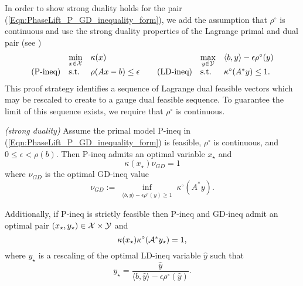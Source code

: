 In order to show strong duality holds for the pair (\ref{Eqn:PhaseLift_P_GD_inequality_form}), we add the assumption that $\rho^\circ$ is continuous and use the strong duality properties of the Lagrange primal and dual pair (see \cite[Section 28]{rockafellar1970convex})
\begin{equation}			\label{Eqn:PhaseLift_P_GD_ineq_Lagrange_dual}
\begin{array}{lllllll}
	&	\min\limits_{\substack{x \in {\mathcal X}}}
		&	\kappa(x)
			&
				&	\max\limits_{\substack{y \in {\mathcal Y}}}
					&	\langle b, y \rangle - \epsilon \rho^\circ(y)
						\\
\textnormal{(P-ineq)}
	&	\textnormal{s.t.}
		& 	\rho(Ax-b) \leq \epsilon
			&	\hspace{0.4cm} 	\textnormal{(LD-ineq)}
				&	\textnormal{s.t.}
					&	\kappa^\circ(A^*y)  \leq 1.
\end{array}
\end{equation}
This proof strategy identifies a sequence of Lagrange dual feasible vectors which may be rescaled to create to a gauge dual feasible sequence.
To guarantee the limit of this sequence exists, we require that $\rho^\circ$ is continuous.


\begin{prop} \label{Prop:strong_duality}
\emph{(strong duality)}
Assume the primal model P-ineq in (\ref{Eqn:PhaseLift_P_GD_inequality_form}) is feasible, $\rho^\circ$ is continuous, and $0 \leq \epsilon < \rho(b)$.  Then P-ineq admits an optimal variable $x_\star$ and
\begin{equation} 			\label{Eqn:strong_duality_1}
\kappa(x_\star) \nu_{GD} = 1
\end{equation}
where $\nu_{GD}$ is the optimal GD-ineq value
\begin{equation}
\nu_{GD} := \inf\limits_{\substack{ \langle b, y \rangle - \epsilon \rho^\circ(y) \geq 1}} \kappa^\circ(A^*y).
\end{equation}

Additionally, if P-ineq is strictly feasible then P-ineq and GD-ineq admit an optimal pair $(x_\star, y_\star) \in {\mathcal X} \times {\mathcal Y}$ and
\begin{equation} 			\label{Eqn:strong_duality_2}
\kappa(x_\star) \kappa^\circ ( {\mathcal A}^* y_\star ) = 1,
\end{equation}
where $y_\star$ is a rescaling of the optimal LD-ineq variable $\hat{y}$ such that
\begin{equation} 			\label{Eqn:strong_duality_3}
y_\star = \frac{\hat{y}}{\langle b, \hat{y} \rangle - \epsilon \rho^\circ(\hat{y})}.
\end{equation}
\end{prop}


